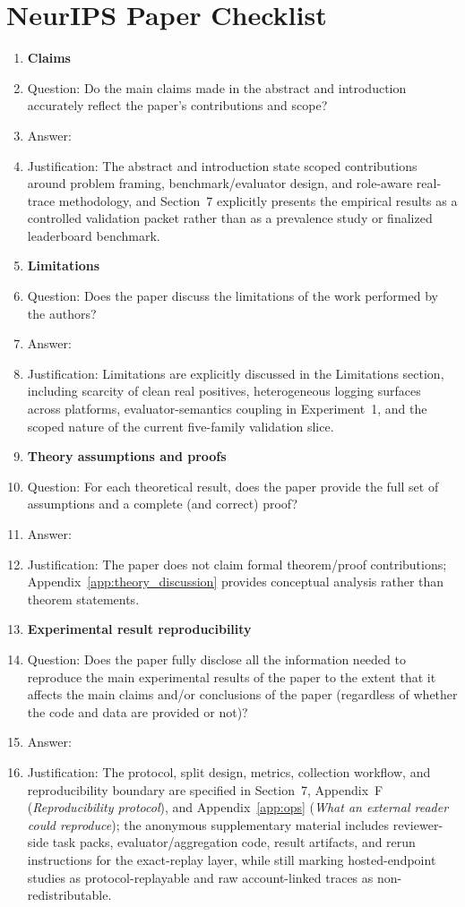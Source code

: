 \section*{NeurIPS Paper Checklist}
\begin{enumerate}

\item \textbf{Claims}
\item[] Question: Do the main claims made in the abstract and introduction accurately reflect the paper's contributions and scope?
\item[] Answer: \answerYes{}
\item[] Justification: The abstract and introduction state scoped contributions around problem framing, benchmark/evaluator design, and role-aware real-trace methodology, and Section~7 explicitly presents the empirical results as a controlled validation packet rather than as a prevalence study or finalized leaderboard benchmark.

\item \textbf{Limitations}
\item[] Question: Does the paper discuss the limitations of the work performed by the authors?
\item[] Answer: \answerYes{}
\item[] Justification: Limitations are explicitly discussed in the Limitations section, including scarcity of clean real positives, heterogeneous logging surfaces across platforms, evaluator-semantics coupling in Experiment~1, and the scoped nature of the current five-family validation slice.

\item \textbf{Theory assumptions and proofs}
\item[] Question: For each theoretical result, does the paper provide the full set of assumptions and a complete (and correct) proof?
\item[] Answer: \answerNA{}
\item[] Justification: The paper does not claim formal theorem/proof contributions; Appendix~\ref{app:theory_discussion} provides conceptual analysis rather than theorem statements.

\item \textbf{Experimental result reproducibility}
\item[] Question: Does the paper fully disclose all the information needed to reproduce the main experimental results of the paper to the extent that it affects the main claims and/or conclusions of the paper (regardless of whether the code and data are provided or not)?
\item[] Answer: \answerYes{}
\item[] Justification: The protocol, split design, metrics, collection workflow, and reproducibility boundary are specified in Section~7, Appendix~F (\textit{Reproducibility protocol}), and Appendix~\ref{app:ops} (\textit{What an external reader could reproduce}); the anonymous supplementary material includes reviewer-side task packs, evaluator/aggregation code, result artifacts, and rerun instructions for the exact-replay layer, while still marking hosted-endpoint studies as protocol-replayable and raw account-linked traces as non-redistributable.


\end{enumerate}
